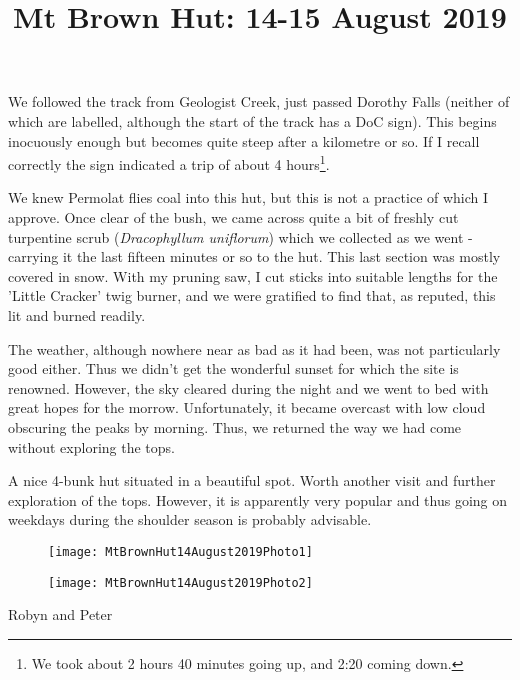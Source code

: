 \documentclass[12pt]{article} %
\title{Mt Brown Hut: 14-15 August 2019}
\makeatletter
\renewcommand{\maketitle}{%
  {\bfseries{\scshape{\Large{\@title\par}}}}
}
\makeatother
\begin{document}
  \maketitle

We followed the track from Geologist Creek, just passed Dorothy Falls (neither of which are labelled, although the start of the track has a DoC sign).  This begins inocuously enough but becomes quite steep after a kilometre or so.  If I recall correctly the sign indicated a trip of about 4 hours\footnote{We took about 2 hours 40 minutes going up, and 2:20 coming down.}.

We knew Permolat flies coal into this hut, but this is not a practice of which I approve.  Once clear of the bush, we came across quite a bit of freshly cut turpentine scrub (\textit{Dracophyllum uniflorum}) which we collected as we went - carrying it the last fifteen minutes or so to the hut.  This last section was mostly covered in snow.  With my pruning saw, I cut sticks into suitable lengths for the 'Little Cracker' twig burner, and we were gratified to find that, as reputed, this lit and burned readily.

The weather, although nowhere near as bad as it had been, was not particularly good either.  Thus we didn't get the wonderful sunset for which the site is renowned.  However, the sky cleared during the night and we went to bed with great hopes for the morrow.  Unfortunately, it became overcast with low cloud obscuring the peaks by morning.  Thus, we returned the way we had come without exploring the tops.

A nice 4-bunk hut situated in a beautiful spot.  Worth another visit and further exploration of the tops.  However, it is apparently very popular and thus going on weekdays during the shoulder season is probably advisable.

\begin{figure}[ht]
\begin{minipage}{.5\linewidth}
\begin{flushleft}
   \texttt{[image: MtBrownHut14August2019Photo1]}
\end{flushleft}
\end{minipage}
\begin{minipage}{.5\linewidth}
\begin{flushright}
    \texttt{[image: MtBrownHut14August2019Photo2]}
\end{flushright}
\end{minipage}
\end{figure}

\begin{flushright}
Robyn and Peter
\end{flushright}
\end{document}
